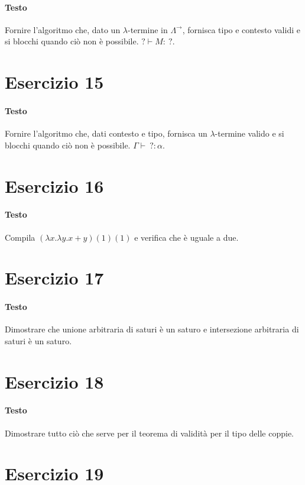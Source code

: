 \documentclass[a4paper,10pt]{article}
\begin{document}
\paragraph{Testo}
Fornire l’algoritmo che, dato un $\lambda$-termine in $\Lambda^\rightarrow$, fornisca tipo e contesto validi e si blocchi quando ciò non è possibile. $? \vdash M :\: ?$.

\section*{Esercizio 15}
\paragraph{Testo}
Fornire l’algoritmo che, dati contesto e tipo, fornisca un $\lambda$-termine valido e si blocchi quando ciò non è possibile. $\Gamma \vdash \: ? : \alpha$.

\section*{Esercizio 16}
\paragraph{Testo}
Compila $(\lambda x.\lambda y. x+y)(1)(1)$ e verifica che è uguale a due.

\section*{Esercizio 17}
\paragraph{Testo}
Dimostrare che unione arbitraria di saturi è un saturo e intersezione arbitraria di saturi è un saturo.

\section*{Esercizio 18}
\paragraph{Testo}
Dimostrare tutto ciò che serve per il teorema di validità per il tipo delle coppie.

\section*{Esercizio 19}
\end{document}
